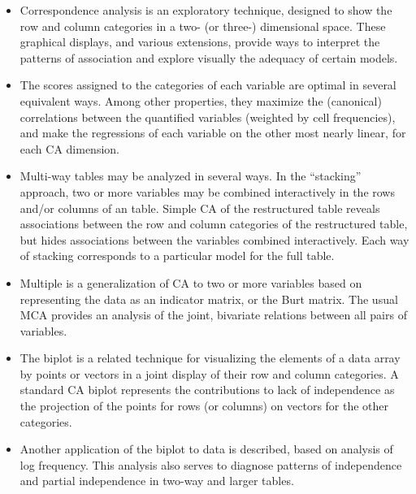 \begin{itemize}
\item Correspondence analysis is an exploratory technique, designed to
show the row and column categories in a two- (or three-) dimensional
space.  These graphical displays, and various extensions, provide
ways to interpret the patterns of association and explore visually
the adequacy of certain \loglin models.

\item The scores assigned to the categories of each variable are optimal
in several equivalent ways.
Among other properties,
they maximize the (canonical) correlations between the quantified
variables (weighted by cell frequencies), and make the regressions
of each variable on the other most nearly linear, for each CA dimension.

\item Multi-way tables may be analyzed in several ways.
In the ``stacking'' approach, two or more variables may be combined
interactively in the rows and/or columns of an \nway table.
Simple CA of the restructured table reveals associations between
the row and column categories of the restructured table,
but hides associations between the variables combined interactively.
Each way of stacking corresponds to a particular \loglin model
for the full table.

\item Multiple \ca is a generalization of CA to two or more variables
based on representing the data as an indicator matrix, or the Burt matrix.
The usual MCA provides an analysis of the joint, bivariate relations
between all pairs of variables.


\item The biplot is a related technique for visualizing the elements of
a data array by points or vectors in a joint display of their row and
column categories. A standard CA biplot represents the contributions to
lack of independence as the projection of the points for rows
(or columns) on vectors for the other categories.

\item Another application of the biplot to \ctab data is described, based on analysis
of log frequency.
This analysis also serves to diagnose patterns of independence and
partial independence in two-way and larger tables.
\end{itemize}
